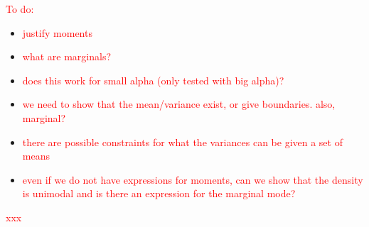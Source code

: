 \documentclass[ba]{imsart}
\numberwithin{equation}{section}
\theoremstyle{plain}
\newcommand{\falta}[1]{\textcolor{red}{#1}}
\begin{document}
\falta{To do:}
\begin{itemize}
\item \falta{justify moments} 
\item \falta{what are marginals?} 
\item \falta{does this work for small alpha (only tested with big
    alpha)?}
\item \falta{we need to show that the mean/variance exist, or give
    boundaries. also, marginal?}
\item \falta{there are possible constraints for what the variances can
    be given a set of means}
\item \falta{even if we do not have expressions for moments, can we
    show that the density is unimodal and is there an expression for
    the marginal mode?}
\end{itemize}





\begin{acknowledgement}
\falta{xxx}
\end{acknowledgement}
\end{document}
